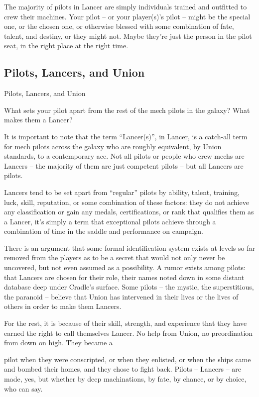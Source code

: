 The majority of pilots in Lancer are simply individuals trained and outfitted to crew their  
machines. Your pilot -- or your player(s)’s pilot -- might be the special one, or the chosen one, or  
otherwise blessed with some combination of fate, talent, and destiny, or they might not. Maybe  
they’re just the person in the pilot seat, in the right place at the right time.   
\subsection{Pilots, Lancers, and Union}
Pilots, Lancers, and Union  
   
What sets your pilot apart from the rest of the mech pilots in the galaxy? What makes them a  
Lancer?  

It is important to note that the term “Lancer(s)”, in Lancer, is a catch-all term for mech pilots  
across the galaxy who are roughly equivalent, by Union standards, to a contemporary ace. Not all  
pilots or people who crew mechs are Lancers -- the majority of them are just competent pilots --  
but all Lancers are pilots.   

Lancers tend to be set apart from “regular” pilots by ability, talent, training, luck, skill, reputation, or  
some combination of these factors: they do not achieve any classification or gain any medals,  
certifications, or rank that qualifies them as a Lancer, it’s simply a term that exceptional pilots  
achieve through a combination of time in the saddle and performance on campaign.   

There is an argument that some formal identification system exists at levels so far removed from  
the players as to be a secret that would not only never be uncovered, but not even assumed as a  
possibility. A rumor exists among pilots: that Lancers are chosen for their role, their names noted  
down in some distant database deep under Cradle’s surface. Some pilots -- the mystic, the  
superstitious, the paranoid -- believe that Union has intervened in their lives or the lives of others  
in order to make them Lancers.  

For the rest, it is because of their skill, strength, and experience that they have earned the right to  
call themselves Lancer. No help from Union, no preordination from down on high. They became a  

                                                                                                                      


pilot when they were conscripted, or when they enlisted, or when the ships came and bombed  
their homes, and they chose to fight back. Pilots -- Lancers -- are made, yes, but whether by deep  
machinations, by fate, by chance, or by choice, who can say.   

